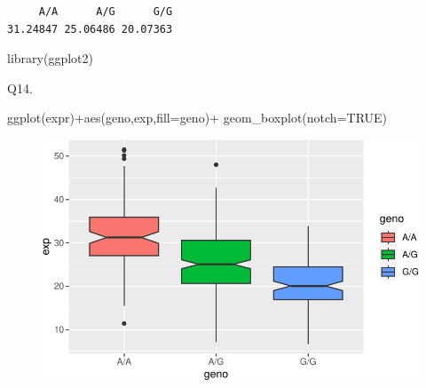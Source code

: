 \documentclass[
  letterpaper,
  DIV=11,
  numbers=noendperiod]{scrartcl}
\newenvironment{Shaded}{\begin{snugshade}}{\end{snugshade}}
\newcommand{\AttributeTok}[1]{\textcolor[rgb]{0.40,0.45,0.13}{#1}}
\newcommand{\ConstantTok}[1]{\textcolor[rgb]{0.56,0.35,0.01}{#1}}
\newcommand{\FunctionTok}[1]{\textcolor[rgb]{0.28,0.35,0.67}{#1}}
\newcommand{\NormalTok}[1]{\textcolor[rgb]{0.00,0.23,0.31}{#1}}
\newcommand{\SpecialCharTok}[1]{\textcolor[rgb]{0.37,0.37,0.37}{#1}}
\begin{document}
\begin{verbatim}
     A/A      A/G      G/G 
31.24847 25.06486 20.07363 
\end{verbatim}

\begin{Shaded}
\begin{Highlighting}[]
\FunctionTok{library}\NormalTok{(ggplot2)}
\end{Highlighting}
\end{Shaded}

Q14.

\begin{Shaded}
\begin{Highlighting}[]
\FunctionTok{ggplot}\NormalTok{(expr)}\SpecialCharTok{+}\FunctionTok{aes}\NormalTok{(geno,exp,}\AttributeTok{fill=}\NormalTok{geno)}\SpecialCharTok{+}
  \FunctionTok{geom\_boxplot}\NormalTok{(}\AttributeTok{notch=}\ConstantTok{TRUE}\NormalTok{)}
\end{Highlighting}
\end{Shaded}

\begin{figure}[H]

{\centering \includegraphics{class12_files/figure-pdf/unnamed-chunk-12-1.pdf}

}

\end{figure}
\end{document}
